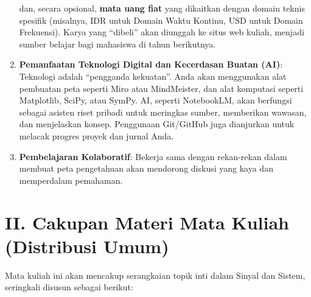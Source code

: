 \documentclass[
  letterpaper,
  DIV=11,
  numbers=noendperiod]{scrreprt}
\begin{document}
\begin{enumerate}
  dan, secara opsional, \textbf{mata uang fiat} yang dikaitkan dengan
  domain teknis spesifik (misalnya, IDR untuk Domain Waktu Kontinu, USD
  untuk Domain Frekuensi). Karya yang ``dibeli'' akan diunggah ke situs
  web kuliah, menjadi sumber belajar bagi mahasiswa di tahun berikutnya.
\item
  \textbf{Pemanfaatan Teknologi Digital dan Kecerdasan Buatan (AI)}:
  Teknologi adalah ``pengganda kekuatan''. Anda akan menggunakan alat
  pembuatan peta seperti Miro atau MindMeister, dan alat komputasi
  seperti Matplotlib, SciPy, atau SymPy. AI, seperti NotebookLM, akan
  berfungsi sebagai asisten riset pribadi untuk meringkas sumber,
  memberikan wawasan, dan menjelaskan konsep. Penggunaan Git/GitHub juga
  dianjurkan untuk melacak progres proyek dan jurnal Anda.
\item
  \textbf{Pembelajaran Kolaboratif}: Bekerja sama dengan rekan-rekan
  dalam membuat peta pengetahuan akan mendorong diskusi yang kaya dan
  memperdalam pemahaman.
\end{enumerate}

\section{\texorpdfstring{\textbf{II. Cakupan Materi Mata Kuliah
(Distribusi
Umum)}}{II. Cakupan Materi Mata Kuliah (Distribusi Umum)}}\label{ii.-cakupan-materi-mata-kuliah-distribusi-umum}

Mata kuliah ini akan mencakup serangkaian topik inti dalam Sinyal dan
Sistem, seringkali disusun sebagai berikut:
\end{document}
